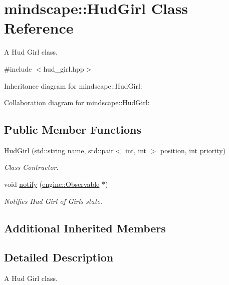 \hypertarget{classmindscape_1_1_hud_girl}{}\section{mindscape\+:\+:Hud\+Girl Class Reference}
\label{classmindscape_1_1_hud_girl}


A Hud Girl class.  




{\ttfamily \#include $<$hud\+\_\+girl.\+hpp$>$}



Inheritance diagram for mindscape\+:\+:Hud\+Girl\+:


Collaboration diagram for mindscape\+:\+:Hud\+Girl\+:
\subsection*{Public Member Functions}
\begin{DoxyCompactItemize}
\item 
\hyperlink{classmindscape_1_1_hud_girl_a71122f6851e5be3bf3cd53647ba61ee4}{Hud\+Girl} (std\+::string \hyperlink{classengine_1_1_game_object_a1f104f7af4f351e6d3278319762c9fe5}{name}, std\+::pair$<$ int, int $>$ position, int \hyperlink{classengine_1_1_game_object_a159ecaca30229e302793b11a75bd13c2}{priority})
\begin{DoxyCompactList}\small\item\em Class Contructor. \end{DoxyCompactList}\item 
void \hyperlink{classmindscape_1_1_hud_girl_aab26eccf3b4c726074174e34ffac817e}{notify} (\hyperlink{classengine_1_1_observable}{engine\+::\+Observable} $\ast$)
\begin{DoxyCompactList}\small\item\em Notifies Hud Girl of Girl\textquotesingle{}s state. \end{DoxyCompactList}\end{DoxyCompactItemize}
\subsection*{Additional Inherited Members}


\subsection{Detailed Description}
A Hud Girl class. 

